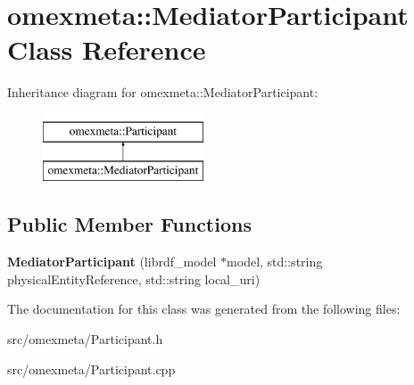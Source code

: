 \hypertarget{classomexmeta_1_1MediatorParticipant}{}\section{omexmeta\+:\+:Mediator\+Participant Class Reference}
\label{classomexmeta_1_1MediatorParticipant}
Inheritance diagram for omexmeta\+:\+:Mediator\+Participant\+:\begin{figure}[H]
\begin{center}
\leavevmode
\includegraphics[height=2.000000cm]{classomexmeta_1_1MediatorParticipant}
\end{center}
\end{figure}
\subsection*{Public Member Functions}
\begin{DoxyCompactItemize}
\item 
\mbox{\label{classomexmeta_1_1MediatorParticipant_a67b259098e2205112e32d78a2099371b}} 
{\bfseries Mediator\+Participant} (librdf\+\_\+model $\ast$model, std\+::string physical\+Entity\+Reference, std\+::string local\+\_\+uri)
\end{DoxyCompactItemize}


The documentation for this class was generated from the following files\+:\begin{DoxyCompactItemize}
\item 
src/omexmeta/Participant.\+h\item 
src/omexmeta/Participant.\+cpp\end{DoxyCompactItemize}
